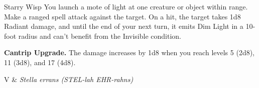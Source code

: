 \begin{Spell}[
  level=Cantrip,
  time=1 Action,
  range=60 ft.,
  components={V, S},
  duration=Instantaneous,
  school=Evocation,
  attack=Ranged,
  effect=Radiant
]{Starry Wisp}
You launch a mote of light at one creature or object within range. Make a ranged spell attack against the target. On a hit, the target takes 1d8 Radiant damage, and until the end of your next turn, it emits Dim Light in a 10-foot radius and can't benefit from the Invisible condition.

\textbf{Cantrip Upgrade.} The damage increases by 1d8 when you reach levels 5 (2d8), 11 (3d8), and 17 (4d8).

\begin{components}
V & \textit{Stella errans (STEL-lah EHR-rahns)}
\end{components}
\end{Spell}


